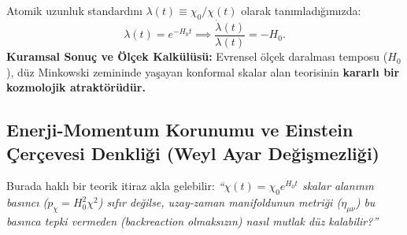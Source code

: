 \documentclass[11pt,a4paper]{article}
\begin{document}
Atomik uzunluk standardını $\lambda(t) \equiv \chi_0 / \chi(t)$ olarak tanımladığımızda:
\begin{equation}
    \lambda(t) = e^{-H_0 t} \implies \frac{\dot{\lambda}(t)}{\lambda(t)} = -H_0.
    \label{eq:hubble_baryon}
\end{equation}
\textbf{Kuramsal Sonuç ve Ölçek Kalkülüsü:} Evrensel ölçek daralması temposu ($H_0$), düz Minkowski zemininde yaşayan konformal skalar alan teorisinin \textbf{kararlı bir kozmolojik atraktörüdür.} 

\subsection{Enerji-Momentum Korunumu ve Einstein Çerçevesi Denkliği (Weyl Ayar Değişmezliği)}
\label{sec:weyl_denkliği}

Burada haklı bir teorik itiraz akla gelebilir: \textit{``$\chi(t) = \chi_0 e^{H_0 t}$ skalar alanının basıncı ($p_\chi = H_0^2\chi^2$) sıfır değilse, uzay-zaman manifoldunun metriği ($\eta_{\mu\nu}$) bu basınca tepki vermeden (backreaction olmaksızın) nasıl mutlak düz kalabilir?''}
\end{document}
